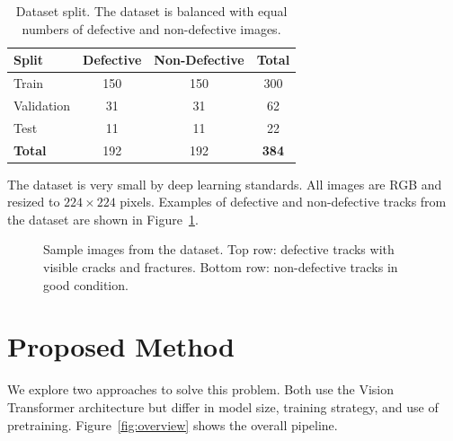 \documentclass[10pt,twocolumn,letterpaper]{article}
\begin{document}
\begin{table}[h]
\centering
\caption{Dataset split. The dataset is balanced with equal numbers of defective and non-defective images.}
\label{tab:dataset}
\begin{tabular}{lccc}
\toprule
\textbf{Split} & \textbf{Defective} & \textbf{Non-Defective} & \textbf{Total} \\
\midrule
Train & 150 & 150 & 300 \\
Validation & 31 & 31 & 62 \\
Test & 11 & 11 & 22 \\
\midrule
\textbf{Total} & 192 & 192 & \textbf{384} \\
\bottomrule
\end{tabular}
\end{table}

The dataset is very small by deep learning standards. All images are RGB and resized to $224 \times 224$ pixels. Examples of defective and non-defective tracks from the dataset are shown in Figure~\ref{fig:samples}.

\begin{figure}[h]
\centering
{}
\caption{Sample images from the dataset. Top row: defective tracks with visible cracks and fractures. Bottom row: non-defective tracks in good condition.}
\label{fig:samples}
\end{figure}

\section{Proposed Method}

We explore two approaches to solve this problem. Both use the Vision Transformer architecture but differ in model size, training strategy, and use of pretraining. Figure~\ref{fig:overview} shows the overall pipeline.
\end{document}
